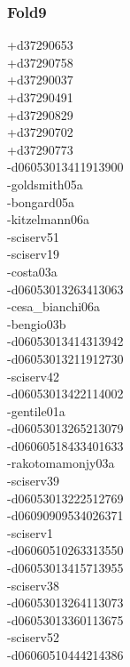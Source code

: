 \begin{multicols}{3}
\subsubsection*{Fold9}
+d37290653\\
+d37290758\\
+d37290037\\
+d37290491\\
+d37290829\\
+d37290702\\
+d37290773\\
-d06053013411913900\\
-goldsmith05a\\
-bongard05a\\
-kitzelmann06a\\
-sciserv51\\
-sciserv19\\
-costa03a\\
-d06053013263413063\\
-cesa\_bianchi06a\\
-bengio03b\\
-d06053013414313942\\
-d06053013211912730\\
-sciserv42\\
-d06053013422114002\\
-gentile01a\\
-d06053013265213079\\
-d06060518433401633\\
-rakotomamonjy03a\\
-sciserv39\\
-d06053013222512769\\
-d06090909534026371\\
-sciserv1\\
-d06060510263313550\\
-d06053013415713955\\
-sciserv38\\
-d06053013264113073\\
-d06053013360113675\\
-sciserv52\\
-d06060510444214386
\end{multicols}